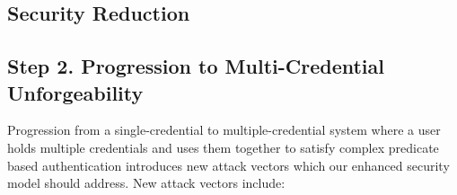 \begin{pchstack}[boxed, center, space=1em]
\begin{pcvstack}
{        }
    \end{pcvstack}
\end{pchstack}











\subsection{Security Reduction}

















\newpage
\subsection{Step 2. Progression to Multi-Credential Unforgeability}
Progression from a single-credential to multiple-credential system where a user holds multiple credentials and uses them together to satisfy complex predicate based authentication introduces new attack vectors which our enhanced security model should address. New attack vectors include:

